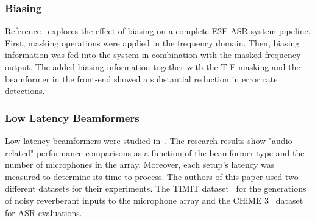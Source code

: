 
\subsubsection{Biasing}
Reference~\cite{20202222222} explores the effect of biasing
on a complete E2E ASR system pipeline. 
First, masking operations were
applied in the frequency domain.
Then, biasing information was fed
into the system in combination with the 
masked frequency output. 
The added biasing information
together with the T-F masking and the beamformer
in the front-end showed a substantial reduction
in error rate detections.



\subsubsection{Low Latency Beamformers}
Low latency beamformers were studied in~\cite{9003849}.
The research results show 
"audio-related" performance comparisons
as a function of the beamformer type and the number
of microphones in the array.
Moreover, each setup's latency was measured to determine 
its time to process. 
The authors of this paper used
two different datasets for their experiments.
The TIMIT dataset~\cite{timitDS} for the generations of noisy reverberant
inputs to the microphone array and the CHiME 3~\cite{chime3DS} dataset
for ASR evaluations.


